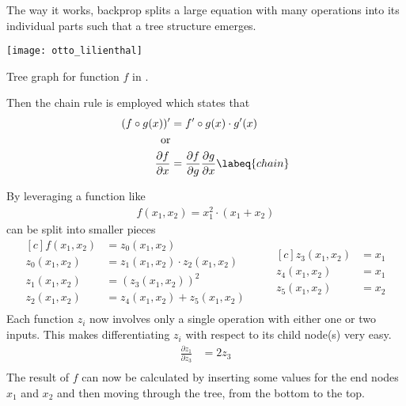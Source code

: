 The way it works, backprop splits a large equation with many operations into its individual parts such that a tree structure emerges.
\begin{marginfigure}
    \texttt{[image: otto\_lilienthal]}
    \caption[]{Tree graph for function $f$ in .}
\end{marginfigure}
Then the chain rule is employed which states that
\begin{align}
    (f \circ g (x))' & = f' \circ g(x) \cdot g'(x) \\
    \text{or} \\
    \frac{\partial f}{\partial x} & = \frac{\partial f}{\partial g} \frac{\partial g}{\partial x}
    \labeq{chain}
\end{align}

By leveraging  a function like 
\begin{align}
    f(x_1, x_2) = x_1^2 \cdot (x_1 + x_2)
\end{align}
can be split into smaller pieces
\begin{equation*}
\begin{aligned}[c]
    f(x_1, x_2) & = z_0(x_1, x_2) \\
    z_0(x_1, x_2) & = z_1(x_1, x_2) \cdot z_2(x_1, x_2) \\
    z_1(x_1, x_2) & = (z_3(x_1, x_2))^2 \\
    z_2(x_1, x_2) & = z_4(x_1, x_2) + z_5(x_1, x_2) \\
\end{aligned}
\qquad
\begin{aligned}[c]
    z_3(x_1, x_2) & = x_1 \\
    z_4(x_1, x_2) & = x_1 \\
    z_5(x_1, x_2) & = x_2 \\
\end{aligned}
\end{equation*}
Each function $z_i$ now involves only a single operation with either one or two inputs.
This makes differentiating $z_i$ with respect to its child node(s) very easy.
\eg
\begin{align}
    \frac{\partial z_1}{\partial z_3} & = 2 z_3 \\
\end{align}
The result of $f$ can now be calculated by inserting some values for the end nodes $x_1$ and $x_2$ and then moving through the tree, from the bottom to the top.
